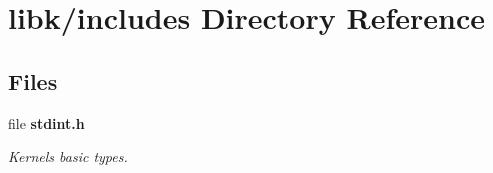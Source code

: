 \section{libk/includes Directory Reference}
\label{dir_8a3957bb9c6a4507113b54e35e4d5d7c}
\subsection*{Files}
\begin{DoxyCompactItemize}
\item 
file \textbf{ stdint.\+h}
\begin{DoxyCompactList}\small\item\em Kernel\textquotesingle{}s basic types. \end{DoxyCompactList}\end{DoxyCompactItemize}
